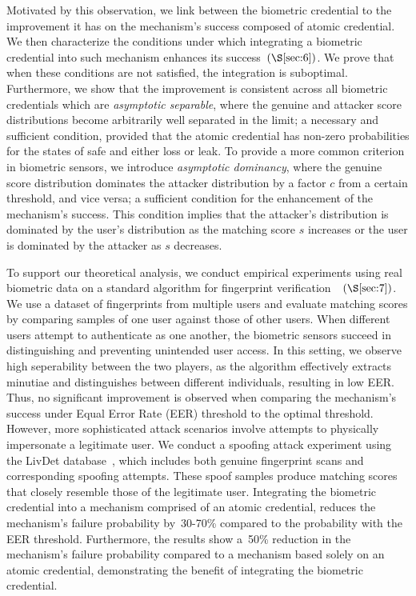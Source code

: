 \documentclass[sigconf]{acmart}
\theoremstyle{definition}
\begin{document}
Motivated by this observation, we link between the biometric credential to the improvement it has on the mechanism's success composed of atomic credential. We then characterize the conditions under which integrating a biometric credential into such mechanism enhances its success~$(\S\ref{sec:6})$. We prove that when these conditions are not satisfied, the integration is suboptimal. Furthermore, we show that the improvement is consistent across all biometric credentials which are \emph{asymptotic separable}, where the genuine and attacker score distributions become arbitrarily well separated in the limit; a necessary and sufficient condition, provided that the atomic credential has non-zero probabilities for the states of safe and either loss or leak. To provide a more common criterion in biometric sensors, we introduce \emph{asymptotic dominancy}, where the genuine score distribution dominates the attacker distribution by a factor $c$ from a certain threshold, and vice versa; a sufficient condition for the enhancement of the mechanism's success. This condition implies that the attacker's distribution is dominated by the user's distribution as the matching score $s$ increases or the user is dominated by the attacker as $s$ decreases.

To support our theoretical analysis, we conduct empirical experiments using real biometric data on a standard algorithm for fingerprint verification~\cite{sourceafis}~$(\S\ref{sec:7})$. We use a dataset of fingerprints from multiple users and evaluate matching scores by comparing samples of one user against those of other users. When different users attempt to authenticate as one another, the biometric sensors succeed in distinguishing and preventing unintended user access. In this setting, we observe high seperability between the two players, as the algorithm effectively extracts minutiae and distinguishes between different individuals, resulting in low EER. Thus, no significant improvement is observed when comparing the mechanism's success under Equal Error Rate (EER) threshold to the optimal threshold. However, more sophisticated attack scenarios involve attempts to physically impersonate a legitimate user. We conduct a spoofing attack experiment using the LivDet database~\cite{LivDet2009,LivDet2011,LivDet2013,LivDet2015}, which includes both genuine fingerprint scans and corresponding spoofing attempts. These spoof samples produce matching scores that closely resemble those of the legitimate user. Integrating the biometric credential into a mechanism comprised of an atomic credential, reduces the mechanism’s failure probability by~30-70\% compared to the probability with the EER threshold. Furthermore, the results show a~50\% reduction in the mechanism’s failure probability compared to a mechanism based solely on an atomic credential, demonstrating the benefit of integrating the biometric credential.
\end{document}
